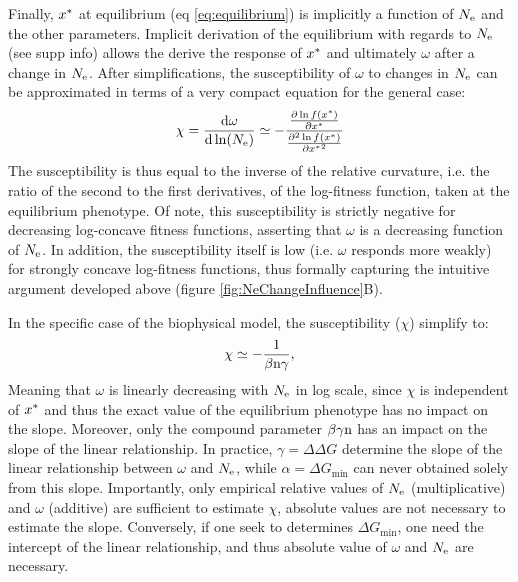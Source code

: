 \documentclass{article}
\begin{document}
	Finally, $x^{*}$ at equilibrium (eq \ref{eq:equilibrium}) is implicitly a function of $N_{\mathrm{e}}$ and the other parameters.
	Implicit derivation of the equilibrium with regards to $N_{\mathrm{e}}$ (see supp info) allows the derive the response of $x^{*}$ and ultimately $\omega$ after a change in $N_{\mathrm{e}}$.
	After simplifications, the susceptibility of $\omega$ to changes in $N_{\mathrm{e}}$ can be approximated in terms of a very compact equation for the general case: 
	\begin{gather}
		\chi = \frac{ \mathrm{d} \omega}{\mathrm{d} \ln (N_{\mathrm{e}})} \simeq - \frac{\frac{ \partial \ln f(x^{*}) }{\partial {x^{*}}}}{\frac{ \partial^2 \ln f(x^{*}) }{\partial {x^{*}}^2}}
	\end{gather}
	The susceptibility is thus equal to the inverse of the relative curvature, i.e. the ratio of the second to the first derivatives, of the log-fitness function, taken at the equilibrium phenotype. Of note, this susceptibility is strictly negative for decreasing log-concave fitness functions, asserting that $\omega$ is a decreasing function of $N_{\mathrm{e}}$. In addition, the susceptibility itself is low (i.e. $\omega$ responds more weakly) for strongly concave log-fitness functions, thus formally capturing the intuitive argument developed above (figure \ref{fig:NeChangeInfluence}B).
	
	In the specific case of the biophysical model, the susceptibility ($\chi$) simplify to:
	\begin{gather}
		\chi \simeq -\dfrac{1}{\beta \text{n} \gamma}, 
	\end{gather}
	Meaning that $\omega$ is linearly decreasing with $N_{\mathrm{e}}$ in log scale, since $\chi$ is independent of $x^{*}$ and thus the exact value of the equilibrium phenotype has no impact on the slope.
	Moreover, only the compound parameter $\beta \gamma \text{n}$ has an impact on the slope of the linear relationship.
	In practice, $\gamma = \Delta \Delta G$ determine the slope of the linear relationship between $\omega$ and $N_{\mathrm{e}}$, while $\alpha = \Delta G_{\text{min}}$ can never obtained solely from this slope.
	Importantly, only empirical relative values of $N_{\mathrm{e}}$ (multiplicative) and $\omega$ (additive) are sufficient to estimate $\chi$, absolute values are not necessary to estimate the slope.
	Conversely, if one seek to determines $\Delta G_{\text{min}}$, one need the intercept of the linear relationship, and thus absolute value of $\omega$ and $N_{\mathrm{e}}$ are necessary.
	
\end{document}
